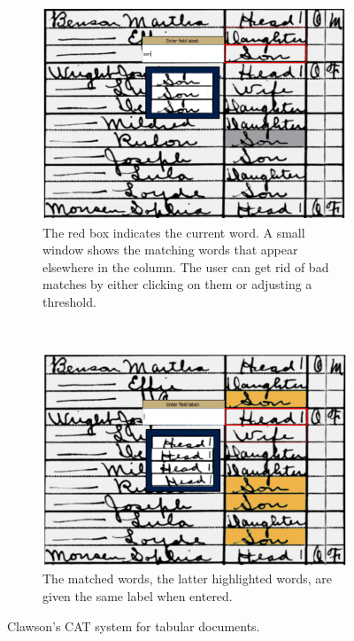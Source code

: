 \documentclass[ms,electronic,twosidetoc,letterpaper,chaptercenter,parttop,lol,lof,lot]{byumsphd}
\begin{document}
\begin{figure}
    \centering
    \begin{subfigure}[t]{0.46\textwidth}
    		\centering
    		\includegraphics[width=\textwidth]{ii_ex_a}
    		\caption{The red box indicates the current word. A small window shows the matching words that appear elsewhere in the column. The user can get rid of bad matches by either clicking on them or adjusting a  threshold.}
    	\end{subfigure}
    	~
    	\begin{subfigure}[t]{0.46\textwidth}
    		\centering
    		\includegraphics[width=\textwidth]{ii_ex_b}
    		\caption{The matched words, the latter highlighted words, are given the same label when entered.}
    	\end{subfigure}
    	\caption{Clawson's CAT system for tabular documents.}
    	\label{fig:ii}
\end{figure}
\end{document}
